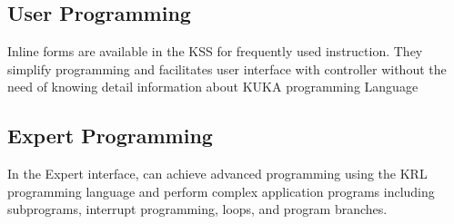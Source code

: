 \documentclass[a4paper]{report}
\begin{document}
\subsection{User Programming}
Inline forms are available in the KSS for frequently used instruction. They simplify programming and facilitates user interface with controller without the need of knowing detail information about KUKA programming Language

 \subsection{Expert Programming}
 In the Expert interface, can achieve advanced programming using the KRL programming language and perform complex application programs including subprograms, interrupt programming, loops, and program branches. 
 

\clearpage
\end{document}

